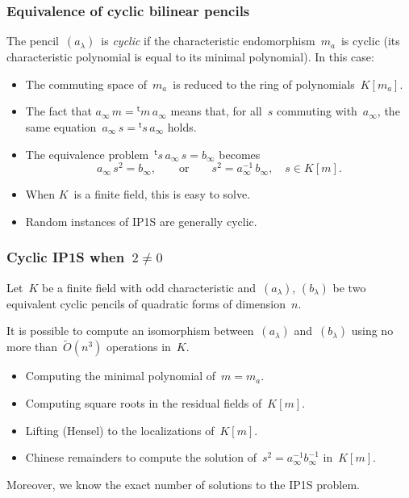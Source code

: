 \documentclass{beamer}%
\def\transpose{{}^{\mathrm{\scriptscriptstyle t}}\!}
\let\mathrm\mathsf
\begin{document}
\begin{frame}\frametitle{Equivalence of cyclic bilinear pencils}%
The pencil~$(a_{λ})$~is \emph{cyclic} if the characteristic
endomorphism~$m_{a}$~is cyclic (its characteristic polynomial is equal to
its minimal polynomial). In this case:
\begin{itemize}
\item The commuting space of~$m_{a}$~is reduced to the ring of
polynomials~$K[m_a]$.
\item The fact that $a_{∞}\, m = \transpose{m}\, a_{∞}$ means that, for
all~$s$ commuting with~$a_{∞}$, the same equation~$a_{∞}\, s =
\transpose{s}\, a_{∞}$ holds.
\item The equivalence problem~$\transpose{s}\, a_{∞}\, s = b_{∞}$ becomes
\begin{equation*}
a_{∞}\, s^2 = b_{∞}, \qquad \text{or}\qquad s^2 = a_{∞}^{-1}\, b_{∞},
\quad s ∈ K[m].
\end{equation*}
\item When $K$~is a finite field, this is easy to solve.
\item Random instances of IP1S are generally cyclic.
\end{itemize}
\end{frame}%
\begin{frame}\frametitle{Cyclic IP1S when~$2 ≠ 0$}%
\begin{theorem}
Let~$K$ be a finite field with odd characteristic and~$(a_{λ})$,
$(b_{λ})$ be two equivalent cyclic pencils of quadratic forms of
dimension~$n$.

It is possible to compute an isomorphism between~$(a_{λ})$ and~$(b_{λ})$
using no more than~$\widetilde O(n^3)$ operations in~$K$.
\end{theorem}
\begin{itemize}
\item Computing the minimal polynomial of~$m = m_a$.
\item Computing square roots in the residual fields of~$K[m]$.
\item Lifting (Hensel) to the localizations of~$K[m]$.
\item Chinese remainders to compute the solution of~$s^2 = a_{∞}^{-1}
b_{∞}^{-1}$ in~$K[m]$.
\end{itemize}
Moreover, we know the exact number of solutions to the IP1S problem.
\end{frame}%
\end{document}
